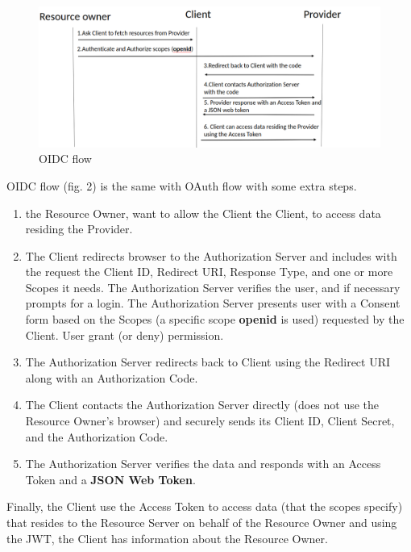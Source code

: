 \begin{figure}[htb]
	\centering
	\includegraphics[scale=0.4]{figures/OIDC.png}
	\caption{OIDC flow}
\end{figure}

OIDC flow (fig. 2) is the same with OAuth flow with some extra steps.

\begin{enumerate}
	\item the Resource Owner, want to allow the Client the Client, to access data residing the Provider.
	
	\item The Client redirects browser to the Authorization Server and includes with the request the Client ID, Redirect URI, Response Type, and one or more Scopes it needs. The Authorization Server verifies the user, and if necessary prompts for a login. The Authorization Server presents user with a Consent form based on the Scopes (a specific scope \textbf{openid} is used) requested by the Client. User grant (or deny) permission.
	
	\item The Authorization Server redirects back to Client using the Redirect URI along with an Authorization Code.
	
	\item The Client contacts the Authorization Server directly (does not use the Resource Owner’s browser) and securely sends its Client ID, Client Secret, and the Authorization Code.
	
	\item The Authorization Server verifies the data and responds with an Access Token and a \textbf{JSON Web Token}.
\end{enumerate}	

Finally, the Client use the Access Token to access data (that the scopes specify) that resides to the Resource Server on behalf of the Resource Owner and using the JWT, the Client has information about the Resource Owner.
	

